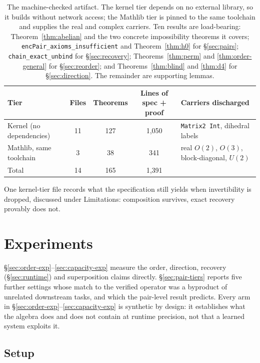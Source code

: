 \documentclass[10pt]{article}
\begin{document}
\begin{table}[h]
\centering
\caption{The machine-checked artifact. The kernel tier depends on no external library, so it builds without network access; the Mathlib tier \citep{mathlib2020} is pinned to the same toolchain and supplies the real and complex carriers. Ten results are load-bearing: Theorem~\ref{thm:abelian} and the two concrete impossibility theorems it covers; \texttt{encPair\_axioms\_insufficient} and Theorem~\ref{thm:h0} for \S\ref{sec:pairs}; \texttt{chain\_exact\_unbind} for \S\ref{sec:recovery}; Theorems~\ref{thm:perm} and \ref{thm:order-general} for \S\ref{sec:reorder}; and Theorems~\ref{thm:blind} and \ref{thm:d4} for \S\ref{sec:direction}. The remainder are supporting lemmas.}
\label{tab:artifact}
\small
\begin{tabular}{lcccp{}}
\toprule
Tier & Files & Theorems & Lines of spec + proof & Carriers discharged \\
\midrule
Kernel (no dependencies) & 11 & 127 & 1{,}050 & \texttt{Matrix2 Int}, dihedral labels \\
Mathlib, same toolchain  & 3 & 38 & 341 & real $O(2)$, $O(3)$, block-diagonal, $U(2)$ \\
\midrule
Total & 14 & 165 & 1{,}391 & \\
\bottomrule
\end{tabular}
\end{table}

One kernel-tier file records what the specification still yields when invertibility is dropped, discussed under Limitations: composition survives, exact recovery provably does not.

\section{Experiments}
\label{sec:experiments}

\S\ref{sec:order-exp}--\ref{sec:capacity-exp} measure the order, direction, recovery (\S\ref{sec:runtime}) and superposition claims directly. \S\ref{sec:pair-tiers} reports five further settings whose match to the verified operator was a byproduct of unrelated downstream tasks, and which the pair-level result predicts. Every arm in \S\ref{sec:order-exp}--\ref{sec:capacity-exp} is synthetic by design: it establishes what the algebra does and does not contain at runtime precision, not that a learned system exploits it.

\subsection{Setup}
\label{sec:setup}
\end{document}
